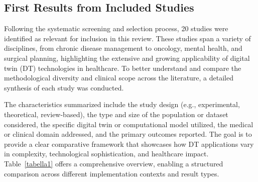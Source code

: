 \documentclass[10pt,a4paper]{article}
\begin{document}
\subsection*{First Results from Included Studies}

Following the systematic screening and selection process, 20 studies were identified as relevant for inclusion in this review. These studies span a variety of disciplines, from chronic disease management to oncology, mental health, and surgical planning, highlighting the extensive and growing applicability of digital twin (DT) technologies in healthcare. To better understand and compare the methodological diversity and clinical scope across the literature, a detailed synthesis of each study was conducted.

The characteristics summarized include the study design (e.g., experimental, theoretical, review-based), the type and size of the population or dataset considered, the specific digital twin or computational model utilized, the medical or clinical domain addressed, and the primary outcomes reported. The goal is to provide a clear comparative framework that showcases how DT applications vary in complexity, technological sophistication, and healthcare impact. Table~\ref{tabella1} offers a comprehensive overview, enabling a structured comparison across different implementation contexts and result types.
\end{document}
